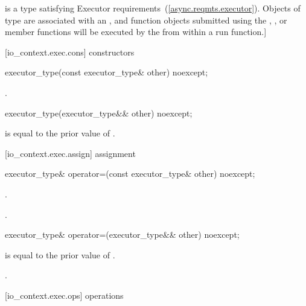 \pnum
{} is a type satisfying Executor requirements~(\ref{async.reqmts.executor}). Objects of type  are associated with an , and function objects submitted using the , , or  member functions will be executed by the  from within a run function.]


[io_context.exec.cons]{ constructors}

\begin{itemdecl}
executor_type(const executor_type& other) noexcept;
\end{itemdecl}

\begin{itemdescr}
\pnum
\postconditions {}.
\end{itemdescr}

\begin{itemdecl}
executor_type(executor_type&& other) noexcept;
\end{itemdecl}

\begin{itemdescr}
\pnum
\postconditions {} is equal to the prior value of .
\end{itemdescr}



[io_context.exec.assign]{ assignment}

\begin{itemdecl}
executor_type& operator=(const executor_type& other) noexcept;
\end{itemdecl}

\begin{itemdescr}
\pnum
\postconditions {}.

\pnum
\returns {}.
\end{itemdescr}

\begin{itemdecl}
executor_type& operator=(executor_type&& other) noexcept;
\end{itemdecl}

\begin{itemdescr}
\pnum
\postconditions {} is equal to the prior value of .

\pnum
\returns {}.
\end{itemdescr}



[io_context.exec.ops]{ operations}

